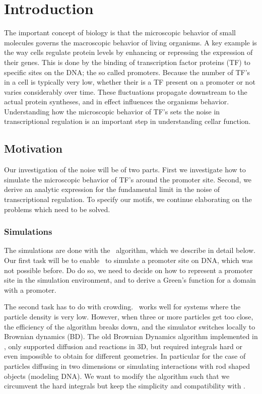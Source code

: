 \section{Introduction}

The important concept of biology is that the microscopic behavior of small molecules governs the macroscopic behavior of living organisms. A key example is the way cells regulate protein levels by enhancing or repressing the expression of their genes. This is done by the binding of transcription factor proteins (TF) to specific sites on the DNA; the so called promoters. Because the number of TF's in a cell is typically very low, whether their is a TF present on a promoter or not varies considerably over time. These fluctuations propagate downstream to the actual protein syntheses, and in effect influences the organisms behavior. Understanding how the microscopic behavior of TF's sets the noise in transcriptional regulation is an important step in understanding cellar function.

\subsection{Motivation}
Our investigation of the noise will be of two parts. First we investigate how to simulate the microscopic behavior of TF's around the promoter site. Second, we derive an analytic expression for the fundamental limit in the noise of transcriptional regulation. To specify our motifs, we continue elaborating on the problems which need to be solved.

\subsubsection{Simulations}
The simulations are done with the \GFRD\, algorithm, which we describe in detail below. Our first task will be to enable \GFRD\, to simulate a promoter site on DNA, which was not possible before. Do do so, we need to decide on how to represent a promoter site in the simulation environment, and to derive a Green's function for a domain with a promoter. 

The second task has to do with crowding. \GFRD\, works well for systems where the particle density is very low. However, when three or more particles get too close, the efficiency of the algorithm breaks down, and the simulator switches locally to Brownian dynamics (BD). The old Brownian Dynamics algorithm implemented in \GFRD \cite{Morelli2008a}, only supported diffusion and reactions in 3D, but required integrals hard or even impossible to obtain for different geometries. In particular for the case of particles diffusing in two dimensions or simulating interactions with rod shaped objects (modeling DNA). We want to modify the algorithm such that we circumvent the hard integrals but keep the simplicity and compatibility with \GFRD.

